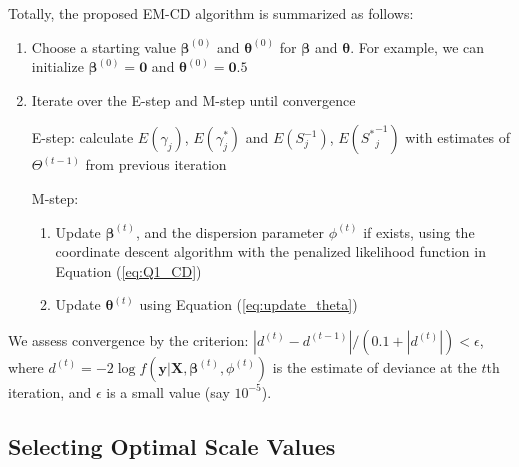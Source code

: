\documentclass[AMA,STIX1COL,]{WileyNJD-v2}
\begin{document}
Totally, the proposed EM-CD algorithm is summarized as follows:

\begin{enumerate}
\def\labelenumi{\arabic{enumi})}
\item
  Choose a starting value \(\boldsymbol{\beta}^{(0)}\) and
  \(\boldsymbol{\theta}^{(0)}\) for \(\boldsymbol{\beta}\) and
  \(\boldsymbol{\theta}\). For example, we can initialize
  \(\boldsymbol{\beta}^{(0)} = \boldsymbol{0}\) and
  \(\boldsymbol{\theta}^{(0)} = \boldsymbol{0}.5\)
\item
  Iterate over the E-step and M-step until convergence

  E-step: calculate \(E(\gamma_{j})\), \(E(\gamma^*_{j})\) and
  \(E({S}^{-1}_{j})\), \(E({S^*}^{-1}_{j})\) with estimates of
  \(\Theta^{(t-1)}\) from previous iteration

  M-step:

  \begin{enumerate}
  \def\labelenumii{\alph{enumii})}
  \item
    Update \(\boldsymbol{\beta}^{(t)}\), and the dispersion parameter
    \(\phi^{(t)}\) if exists, using the coordinate descent algorithm
    with the penalized likelihood function in Equation (\ref{eq:Q1_CD})
  \item
    Update \(\boldsymbol{\theta}^{(t)}\) using Equation
    (\ref{eq:update_theta})
  \end{enumerate}
\end{enumerate}

We assess convergence by the criterion:
\(|d^{(t)}-d^{(t-1)}|/(0.1+|d^{(t)}|)<\epsilon\), where
\(d^{(t)} = -2\log f(\textbf{y}| \textbf{X}, \boldsymbol{\beta}^{(t)},\phi^{(t)})\)
is the estimate of deviance at the \(t\)th iteration, and \(\epsilon\)
is a small value (say \(10^{-5}\)).

\subsection{Selecting Optimal Scale Values}
\label{sec:tune}
\end{document}
